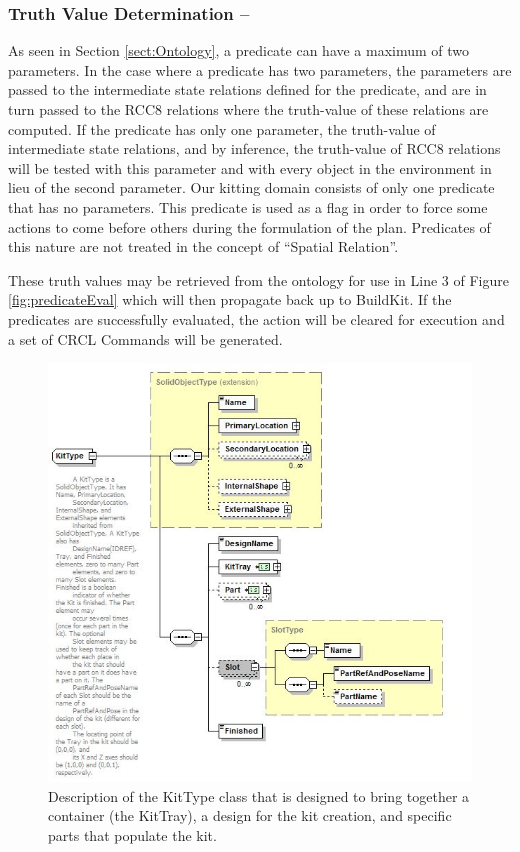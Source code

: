 \subsubsection{Truth Value Determination --}
As seen in Section \ref{sect:Ontology}, a predicate can have a maximum of two parameters. In the case where a predicate has two parameters, the parameters are passed to the intermediate state relations defined for the predicate, and are in turn passed to the RCC8 relations where the truth-value of these relations are computed. If the predicate has only one parameter, the truth-value of intermediate state relations, and by inference, the truth-value of RCC8 relations will be tested with this parameter and with every object in the environment in lieu of the second parameter. Our kitting domain consists of only one predicate that has no parameters. This predicate is used as a flag in order to force some actions to come before others during the formulation of the plan. Predicates of this nature are not treated in the concept of ``Spatial Relation''.

These truth values may be retrieved from the ontology for use in Line 3 of Figure
\ref{fig:predicateEval} which will then propagate back up to {\sc BuildKit}. If
the predicates are successfully evaluated, the action will be cleared for 
execution and a set of CRCL Commands will be 
generated.
%
\begin{figure}[htb!]
\begin{center}
\includegraphics[width=12cm]{images/Kit.jpg}
\caption{Description of the KitType class that is designed to bring together
a container (the KitTray), a design for the kit creation, and specific parts
that populate the kit.}
\label{fig:kit}
\end{center}
\end{figure}
%
